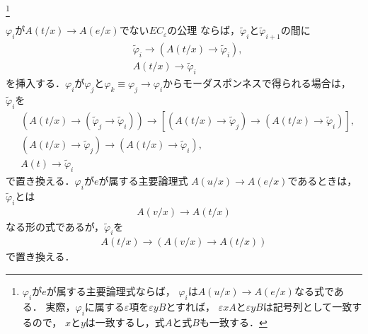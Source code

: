 \begin{description}
			\footnote{
				$\varphi_{i}$が$e$が属する主要論理式ならば，
				$\varphi_{i}$は$A(u/x) \rightarrow A(e/x)$なる式である．
				実際，$\varphi_{i}$に属する$\varepsilon$項を$\varepsilon y B$とすれば，
				$\varepsilon x A$と$\varepsilon y B$は記号列として一致するので，
				$x$と$y$は一致するし，式$A$と式$B$も一致する．
			}
	
			$\varphi_{i}$が$A(t/x) \rightarrow A(e/x)$でない$EC_{\varepsilon}$の公理
			ならば，$\tilde{\varphi}_{i}$と$\tilde{\varphi}_{i+1}$の間に
			\begin{align}
				&\tilde{\varphi}_{i} \rightarrow 
				\left( A(t/x) \rightarrow \tilde{\varphi}_{i} \right), \\
				&A(t/x) \rightarrow \tilde{\varphi}_{i}
			\end{align}
			を挿入する．$\varphi_{i}$が$\varphi_{j}$と$\varphi_{k}
			\equiv \varphi_{j} \rightarrow \varphi_{i}$からモーダスポンネスで得られる場合は，
			$\tilde{\varphi}_{i}$を
			\begin{align}
				&\left( A(t/x) \rightarrow \left(\tilde{\varphi}_{j} \rightarrow
				\tilde{\varphi}_{i} \right) \right)
				\rightarrow \left[ \left( A(t/x) \rightarrow \tilde{\varphi}_{j} \right)
				\rightarrow \left( A(t/x) \rightarrow \tilde{\varphi}_{i} \right) \right], \\
				&\left( A(t/x) \rightarrow \tilde{\varphi}_{j} \right)
				\rightarrow \left( A(t/x) \rightarrow \tilde{\varphi}_{i} \right), \\
				&A(t) \rightarrow \tilde{\varphi}_{i}
			\end{align}
			で置き換える．$\varphi_{i}$が$e$が属する主要論理式
			$A(u/x) \rightarrow A(e/x)$であるときは，$\tilde{\varphi}_{i}$とは
			\begin{align}
				A(v/x) \rightarrow A(t/x)
			\end{align}
			なる形の式であるが，$\tilde{\varphi}_{i}$を
			\begin{align}
				A(t/x) \rightarrow (A(v/x) \rightarrow A(t/x))
			\end{align}
			で置き換える．
	

\end{description}
